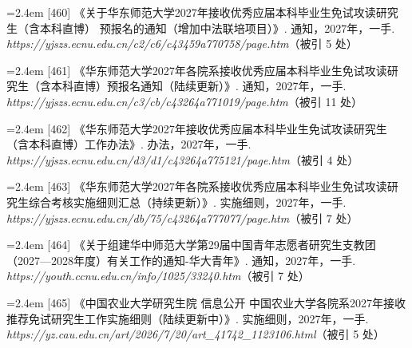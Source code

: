 {\vspace{0.6pt}
\vspace{3.5pt}\par
\nopagebreak\vspace{1pt}
\noindent\hangindent=2.4em \label{src:S0610}{\color{cAccent}[460]} 《关于华东师范大学2027年接收优秀应届本科毕业生免试攻读研究生（含本科直博） 预报名的通知（增加中法联培项目）》. 通知，2027年，一手. \textit{https://yjszs.ecnu.edu.cn/c2/c6/c43459a770758/page.htm}（被引 5 处）\par
\vspace{0.6pt}
\noindent\hangindent=2.4em \label{src:S0611}{\color{cAccent}[461]} 《华东师范大学2027年各院系接收优秀应届本科毕业生免试攻读研究生（含本科直博）预报名通知（陆续更新）》. 通知，2027年，一手. \textit{https://yjszs.ecnu.edu.cn/c3/cb/c43264a771019/page.htm}（被引 11 处）\par
\vspace{0.6pt}
\noindent\hangindent=2.4em \label{src:S0612}{\color{cAccent}[462]} 《华东师范大学2027年接收优秀应届本科毕业生免试攻读研究生（含本科直博）工作办法》. 办法，2027年，一手. \textit{https://yjszs.ecnu.edu.cn/d3/d1/c43264a775121/page.htm}（被引 4 处）\par
\vspace{0.6pt}
\noindent\hangindent=2.4em \label{src:S0613}{\color{cAccent}[463]} 《华东师范大学2027年各院系接收优秀应届本科毕业生免试攻读研究生综合考核实施细则汇总（持续更新）》. 实施细则，2027年，一手. \textit{https://yjszs.ecnu.edu.cn/db/75/c43264a777077/page.htm}（被引 7 处）\par
\vspace{0.6pt}
\vspace{3.5pt}\par
\nopagebreak\vspace{1pt}
\noindent\hangindent=2.4em \label{src:S0614}{\color{cAccent}[464]} 《关于组建华中师范大学第29届中国青年志愿者研究生支教团（2027—2028年度）有关工作的通知-华大青年》. 通知，2027年，一手. \textit{https://youth.ccnu.edu.cn/info/1025/33240.htm}（被引 7 处）\par
\vspace{0.6pt}
\vspace{3.5pt}\par
\nopagebreak\vspace{1pt}
\noindent\hangindent=2.4em \label{src:S0615}{\color{cAccent}[465]} 《中国农业大学研究生院 信息公开 中国农业大学各院系2027年接收推荐免试研究生工作实施细则（陆续更新中）》. 实施细则，2027年，一手. \textit{https://yz.cau.edu.cn/art/2026/7/20/art\_41742\_1123106.html}（被引 5 处）\par
}
